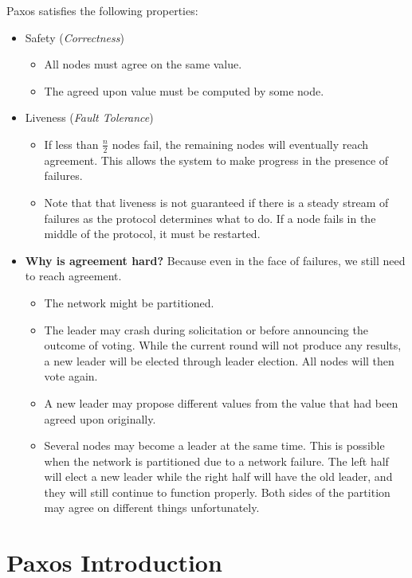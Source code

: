 \documentclass[twoside]{article}
\begin{document}
Paxos satisfies the following properties:
\begin{itemize}
    \item Safety (\emph{Correctness})
        \begin{itemize}
            \item All nodes must agree on the same value.
            \item The agreed upon value must be computed by some node.
        \end{itemize}
    \item Liveness (\emph{Fault Tolerance})
        \begin{itemize}
            \item If less than $\frac{n}{2}$ nodes fail, the remaining nodes will eventually reach agreement. This allows the system to make progress in the presence of failures.
            \item Note that that liveness is not guaranteed if there is a steady stream of failures as the protocol determines what to do. If a node fails in the middle of the protocol, it must be restarted.
        \end{itemize}
    \item \textbf{Why is agreement hard?} Because even in the face of failures, we still need to reach agreement.
        \begin{itemize}
            \item The network might be partitioned. 
            \item The leader may crash during solicitation or before
            announcing the outcome of voting. While the current round will not produce any results, a new leader will be elected through leader election. All nodes will then vote again. 
            \item A new leader may propose different values from the value that had been agreed upon originally.
            \item Several nodes may become a leader at the same time. This is possible when the network is partitioned due to a network failure. The left half will elect a new leader while the right half will have the old leader, and they will still continue to function properly. Both sides of the partition may agree on different things unfortunately.
        \end{itemize}
\end{itemize}

\section{Paxos Introduction}
\end{document}
